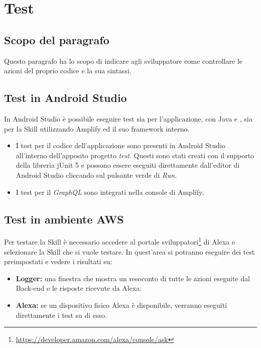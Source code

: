 \pagebreak

\section{Test}
\label{sec:test}
\subsection{Scopo del paragrafo}
Questo paragrafo ha lo scopo di indicare agli sviluppatore come controllare le azioni del proprio codice e la sua sintassi.

\subsection{Test in Android Studio}
In Android Studio è possibile eseguire test sia per l'applicazione, con Java e , sia per la Skill utilizzando Amplify ed il suo framework interno.
\begin{itemize}
    \item I test per il codice dell'applicazione sono presenti in Android Studio all'interno dell'apposito progetto \emph{test}. Questi sono stati creati con il supporto della libreria jUnit 5 e possono essere eseguiti direttamente dall'editor di Android Studio cliccando sul pulsante verde di \emph{Run}.
    \item I test per il \emph{GraphQL} sono integrati nella console di Amplify.
\end{itemize}

\subsection{Test in ambiente AWS}
Per testare la Skill è necessario accedere al portale sviluppatori\footnote{\href{https://developer.amazon.com/alexa/console/ask}{https://developer.amazon.com/alexa/console/ask}} di Alexa e selezionare la Skill che si vuole testare. In quest'area si potranno eseguire dei test preimpostati e vedere i risultati su:
\begin{itemize}
    \item \textbf{Logger:} una finestra che mostra un resoconto di tutte le azioni eseguite dal Back-end e le risposte ricevute da Alexa:
    \item \textbf{Alexa:} se un dispositivo fisico Alexa è disponibile, verranno eseguiti direttamente i test su di esso.
\end{itemize}
